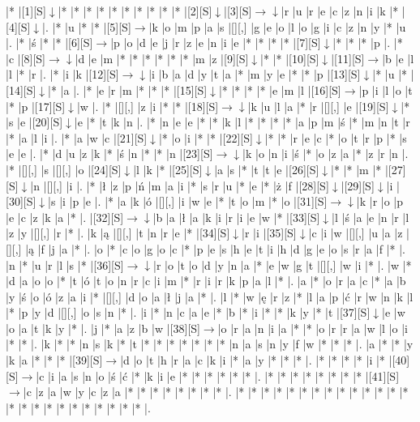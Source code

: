 \documentclass[11pt]{article}
\newcommand\drarr{$\rightarrow \!\!\!\!\! \downarrow$}
\newcommand\rarr{$\rightarrow$}
\newcommand\darr{$\downarrow$}
\begin{document}
\noindent\begin{Puzzle}{24}{26}|*	|[1][S]\darr	|*	|*	|*	|*	|*	|*	|*	|*	|*	|*	|[2][S]\darr	|[3][S]\drarr	|r	|u	|r	|e	|c	|z	|n	|i	|k	|*	|[4][S]\darr	|.
|*	|u	|*	|*	|[5][S]\rarr	|k	|o	|m	|p	|a	|s	|[][,]{ }	|g	|e	|o	|l	|o	|g	|i	|c	|z	|n	|y	|*	|u	|.
|*	|ś	|*	|*	|[6][S]\rarr	|p	|o	|d	|e	|j	|r	|z	|e	|n	|i	|e	|*	|*	|*	|*	|[7][S]\darr	|*	|*	|*	|p	|.
|*	|c	|[8][S]\drarr	|d	|e	|m	|*	|*	|*	|*	|*	|*	|m	|z	|[9][S]\darr	|*	|*	|[10][S]\darr	|[11][S]\rarr	|b	|e	|l	|l	|*	|r	|.
|*	|i	|k	|[12][S]\drarr	|i	|b	|a	|d	|y	|t	|a	|*	|m	|y	|e	|*	|*	|p	|[13][S]\darr	|*	|u	|*	|[14][S]\darr	|*	|a	|.
|*	|e	|r	|m	|*	|*	|*	|[15][S]\darr	|*	|*	|*	|*	|e	|m	|l	|[16][S]\rarr	|p	|i	|l	|o	|t	|*	|p	|[17][S]\darr	|w	|.
|*	|[][,]{ }	|z	|i	|*	|*	|[18][S]\drarr	|k	|u	|l	|a	|*	|r	|[][,]{ }	|e	|[19][S]\darr	|*	|s	|e	|[20][S]\darr	|e	|*	|t	|k	|n	|.
|*	|n	|e	|e	|*	|*	|k	|l	|*	|*	|*	|*	|a	|p	|m	|ś	|*	|m	|n	|t	|r	|*	|a	|l	|i	|.
|*	|a	|w	|c	|[21][S]\darr	|*	|o	|i	|*	|*	|[22][S]\darr	|*	|*	|r	|e	|c	|*	|o	|t	|r	|p	|*	|s	|e	|e	|.
|*	|d	|u	|z	|k	|*	|ś	|n	|*	|*	|n	|[23][S]\drarr	|k	|o	|n	|i	|ś	|*	|o	|z	|a	|*	|z	|r	|n	|.
|*	|[][,]{ }	|s	|[][,]{ }	|o	|[24][S]\darr	|l	|k	|*	|[25][S]\darr	|a	|s	|*	|t	|t	|e	|[26][S]\darr	|*	|*	|m	|*	|[27][S]\darr	|n	|[][,]{ }	|i	|.
|*	|ł	|z	|p	|ń	|m	|a	|i	|*	|s	|r	|u	|*	|e	|*	|ż	|f	|[28][S]\darr	|[29][S]\darr	|i	|[30][S]\darr	|s	|i	|p	|e	|.
|*	|a	|k	|ó	|[][,]{ }	|i	|w	|e	|*	|t	|o	|m	|*	|o	|[31][S]\drarr	|k	|r	|o	|p	|e	|c	|z	|k	|a	|*	|.
|[32][S]\drarr	|b	|a	|ł	|a	|k	|i	|r	|i	|e	|w	|*	|[33][S]\darr	|l	|ś	|a	|e	|n	|r	|l	|z	|y	|[][,]{ }	|r	|*	|.
|k	|ą	|[][,]{ }	|t	|n	|r	|e	|*	|[34][S]\darr	|r	|i	|[35][S]\darr	|c	|i	|w	|[][,]{ }	|u	|a	|z	|[][,]{ }	|ą	|f	|j	|a	|*	|.
|o	|*	|c	|o	|g	|o	|c	|*	|p	|e	|s	|h	|e	|t	|i	|h	|d	|g	|e	|o	|s	|r	|a	|f	|*	|.
|n	|*	|u	|r	|l	|s	|*	|[36][S]\drarr	|r	|o	|t	|o	|d	|y	|n	|a	|*	|e	|w	|g	|t	|[][,]{ }	|w	|i	|*	|.
|w	|*	|d	|a	|o	|o	|*	|t	|ó	|t	|o	|n	|r	|c	|i	|m	|*	|r	|i	|r	|k	|p	|a	|l	|*	|.
|a	|*	|o	|r	|a	|c	|*	|a	|b	|y	|ś	|o	|ó	|z	|a	|i	|*	|[][,]{ }	|d	|o	|a	|ł	|j	|a	|*	|.
|l	|*	|w	|ę	|r	|z	|*	|l	|a	|p	|ć	|r	|w	|n	|k	|l	|*	|p	|y	|d	|[][,]{ }	|o	|s	|n	|*	|.
|i	|*	|n	|c	|a	|e	|*	|b	|*	|i	|*	|*	|k	|y	|*	|t	|[37][S]\darr	|e	|w	|o	|a	|t	|k	|y	|*	|.
|j	|*	|a	|z	|b	|w	|[38][S]\rarr	|o	|r	|a	|n	|i	|a	|*	|*	|o	|r	|r	|a	|w	|l	|o	|i	|*	|*	|.
|k	|*	|*	|n	|s	|k	|*	|t	|*	|*	|*	|*	|*	|*	|*	|n	|a	|s	|n	|y	|f	|w	|*	|*	|*	|.
|a	|*	|*	|y	|k	|a	|*	|*	|*	|[39][S]\rarr	|d	|o	|t	|h	|r	|a	|c	|k	|i	|*	|a	|y	|*	|*	|*	|.
|*	|*	|*	|*	|i	|*	|[40][S]\rarr	|c	|i	|a	|s	|n	|o	|ś	|ć	|*	|k	|i	|e	|*	|*	|*	|*	|*	|*	|.
|*	|*	|*	|*	|*	|*	|*	|*	|[41][S]\rarr	|c	|z	|a	|w	|y	|c	|z	|a	|*	|*	|*	|*	|*	|*	|*	|*	|.
|*	|*	|*	|*	|*	|*	|*	|*	|*	|*	|*	|*	|*	|*	|*	|*	|*	|*	|*	|*	|*	|*	|*	|*	|*	|.\end{Puzzle}
\end{document}
